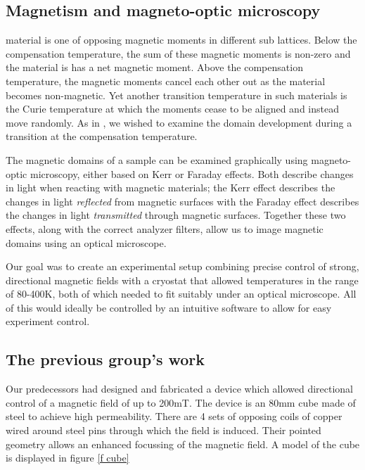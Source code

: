 \documentclass[journal]{IEEEtran}
\begin{document}
\subsection{Magnetism and magneto-optic microscopy}
 material is one of opposing magnetic moments in different sub lattices. Below the compensation temperature, the sum of these magnetic moments is non-zero and the material is has a net magnetic moment. Above the compensation temperature, the magnetic moments cancel each other out as the material becomes non-magnetic. Yet another transition temperature in such materials is the Curie temperature at which the moments cease to be aligned and instead move randomly. As in \cite{garnet}, we wished to examine the domain development during a transition at the compensation temperature.

The magnetic domains of a sample can be examined graphically using magneto-optic microscopy, either based on Kerr or Faraday effects. Both describe changes in light when reacting with magnetic materials; the Kerr effect describes the changes in light \emph{reflected} from magnetic surfaces with the Faraday effect describes the changes in light \emph{transmitted} through magnetic surfaces. Together these two effects, along with the correct analyzer filters, allow us to image magnetic domains using an optical microscope.

Our goal was to create an experimental setup combining precise control of strong, directional magnetic fields with a cryostat that allowed temperatures in the range of 80-400K, both of which needed to fit suitably under an optical microscope. All of this would ideally be controlled by an intuitive software to allow for easy experiment control.

\subsection{The previous group's work}
Our predecessors had designed and fabricated a device which allowed directional control of a magnetic field of up to 200mT. The device is an 80mm cube made of steel to achieve high permeability. There are 4 sets of opposing coils of copper wired around steel pins through which the field is induced. Their pointed geometry allows an enhanced focussing of the magnetic field. A model of the cube is displayed in figure \ref{f cube}
\end{document}
